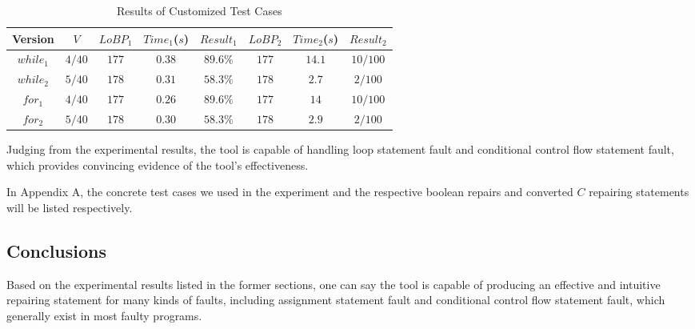\begin{table}
\small
\center
\caption{Results of Customized Test Cases}
\label{table:RoCTC}
\begin{tabular}{|c|c|c|c|c|c|c|c|}
\hline
Version   & $V$     & $LoBP_{1}$ & $Time_{1}$($s$) & $Result_{1}$ &$LoBP_{2}$ & $Time_{2}$($s$) & $Result_{2}$ \\
\hline
$while_1$ & $4/40$  & $177$      & $0.38$          & $89.6\%$     & $177$     & $14.1$          & $10/100$     \\
\hline
$while_2$ & $5/40$  & $178$      & $0.31$          & $58.3\%$     & $178$     & $2.7$           & $2/100$      \\
\hline
$for_1$   & $4/40$  & $177$      & $0.26$          & $89.6\%$     & $177$     & $14$            & $10/100$     \\
\hline
$for_2$   & $5/40$  & $178$      & $0.30$          & $58.3\%$     & $178$     & $2.9$           & $2/100$      \\
\hline
\end{tabular}
\end{table}

Judging from the experimental results, the tool is capable of handling loop statement fault and conditional control flow statement fault,
which provides convincing evidence of the tool's effectiveness.

In Appendix A, the concrete test cases we used in the experiment and the respective boolean repairs and converted $C$ repairing statements will be listed respectively.

\subsection{Conclusions}
Based on the experimental results listed in the former sections, one can say the tool is capable of producing an effective and intuitive repairing statement for many kinds of faults,
including assignment statement fault and conditional control flow statement fault, which generally exist in most faulty programs.

